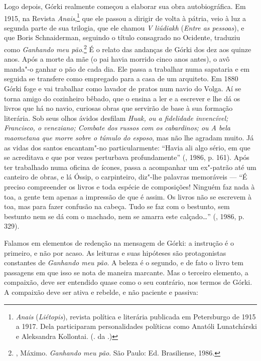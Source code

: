 Logo depois, Górki realmente começou a elaborar sua obra
autobiográfica. Em 1915, na Revista \emph{Anais},\footnote{\emph{Anais}
(\emph{Liétopis}), revista política e literária publicada em
Petersburgo de 1915 a 1917. Dela participaram personalidades
políticas como Anatóli Lunatchárski e Aleksandra Kollontai.
(. da .)} que ele passou a dirigir de volta à
pátria, veio à luz a segunda parte de sua trilogia, que ele
chamou \emph{V liúdiakh} (\emph{Entre as pessoas}), e que Boris
Schnaiderman, seguindo o título consagrado no Ocidente, traduziu
como \emph{Ganhando meu pão}.\footnote{, Máximo.
\emph{Ganhando meu pão}. São Paulo: Ed. Brasiliense, 1986.} É
o relato das andanças de Górki dos dez aos quinze anos. Após a
morte da mãe (o pai havia morrido cinco anos antes), o avô
manda"-o ganhar o pão de cada dia. Ele passa a trabalhar
numa sapataria e em seguida se transfere como empregado para
a casa de um arquiteto. Em 1880 Górki foge e vai trabalhar como
lavador de pratos num navio do Volga. Aí se torna amigo do
cozinheiro bêbado, que o ensina a ler e a escrever e lhe dá os
livros que há no navio, curiosas obras que
servirão de base à sua formação literária. Sob seus olhos ávidos
desfilam \emph{Huak, ou a fidelidade invencível; Francisco, o veneziano;
Combate dos russos com os cabardinos; ou A bela maometana que morre
sobre o túmulo do esposo}, mas não lhe agradam muito. Já as vidas
dos santos encantam"-no particularmente: ``Havia ali algo sério,
em que se acreditava e que por vezes perturbava
profundamente'' (, 1986, p. 161). Após ter
trabalhado numa oficina de ícones, passa a acompanhar um
ex"-patrão até um canteiro de obras, e lá Óssip, o carpinteiro,
diz"-lhe palavras memoráveis --- ``É preciso compreender os
livros e toda espécie de composições! Ninguém faz nada à toa,
a gente tem apenas a impressão de que é assim. Os livros não se
escrevem à toa, mas para fazer confusão na cabeça. Tudo se faz
com o bestunto, sem bestunto nem se dá com o machado, nem se
amarra este calçado\ldots{}'' (, 1986, p. 329).

Falamos em elementos de redenção na mensagem de Górki: a instrução é o primeiro, e não por acaso. As leituras e suas hipóteses são protagonistas constantes de \emph{Ganhando meu pão}. A beleza é o segundo, e de fato o livro tem passagens em que isso se nota de maneira marcante. Mas o terceiro elemento, a compaixão, deve ser entendido quase como o seu contrário, nos termos de Górki. A compaixão deve ser ativa e rebelde, e não paciente e passiva: 

